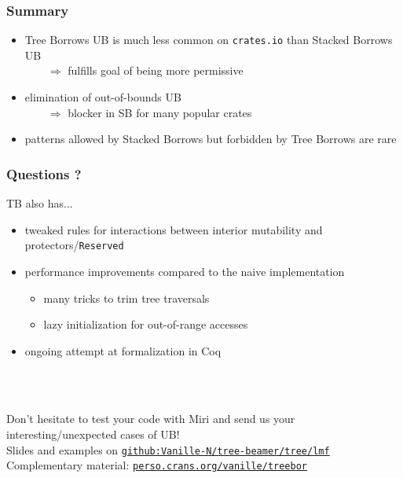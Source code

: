 \begin{frame}
    \frametitle{Summary}
    \begin{itemize}
        \item Tree Borrows UB is much less common on \texttt{crates.io} than Stacked Borrows UB\\
            \(\qquad\Rightarrow\) fulfills goal of being more permissive
        \item elimination of out-of-bounds UB\\
            \(\qquad\Rightarrow\) blocker in SB for many popular crates
        \item patterns allowed by Stacked Borrows but forbidden by Tree Borrows are rare
    \end{itemize}
\end{frame}

\begin{frame}
    \frametitle{Questions ?}

    TB also has...
    \begin{itemize}
        \item tweaked rules for interactions between interior mutability and protectors/\texttt{Reserved}
        \item performance improvements compared to the naive implementation
            \begin{itemize}
                \item many tricks to trim tree traversals
                \item lazy initialization for out-of-range accesses
            \end{itemize}
        \item ongoing attempt at formalization in Coq
    \end{itemize}~\\~\\
    \vfill

    Don't hesitate to test your code with Miri and send us your interesting/unexpected cases of UB!\\
    Slides and examples on \href{https://github.com/Vanille-N/tree-beamer/tree/lmf}{\texttt{github:Vanille-N/tree-beamer/tree/lmf}}\\
    Complementary material: \href{https://perso.crans.org/vanille/treebor}{\texttt{perso.crans.org/vanille/treebor}}\\
\end{frame}
